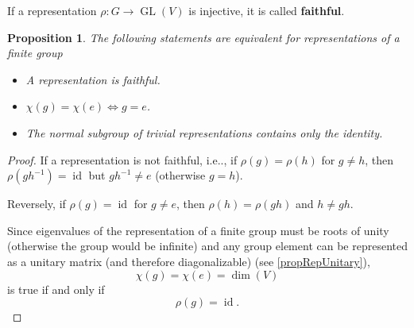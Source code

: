 \documentclass[12pt, letterpaper]{article}
\makeatletter
\newcommand{\GL}{\operatorname{GL}}
\newcommand{\idt}{\operatorname{id}}
\newcommand\ie{i.e\@ifnextchar.{}{.\@}}
\newtheorem{prop}{Proposition}[section]
\theoremstyle{definition}
\theoremstyle{remark}
\theoremstyle{definition}
\theoremstyle{plain}
\numberwithin{equation}{section}
\makeatother
\begin{document}
	\begin{def*}
		If a representation $\rho\colon G\to \GL(V)$ is injective, it is called \textbf{faithful}.
	\end{def*}
	\begin{prop}\label{propFaithful}
		The following statements are equivalent for representations of a finite group
		\begin{itemize}
			\item A representation is faithful.
			\item $\chi(g)=\chi(e)\iff g=e$.
			\item The normal subgroup of trivial representations contains only the identity.
		\end{itemize}
	\end{prop}
	\begin{proof}
		If a representation is not faithful, \ie, if $\rho(g)=\rho(h)$ for $g\ne h$,
		then $\rho(gh^{-1})=\idt$ but $gh^{-1}\ne e$ (otherwise $g=h$).
		
		Reversely, if $\rho(g)=\idt$ for $g\ne e$, then $\rho(h)=\rho(gh)$ and $h\ne gh$.
		
		Since eigenvalues of the representation of a finite group must be roots of unity (otherwise the group would be infinite)
		and any group element can be represented as a unitary matrix (and therefore diagonalizable) (see \ref{propRepUnitary}),
		\[\chi(g)=\chi(e)=\dim(V) \] is true if and only if \[\rho(g)=\idt.\]
	\end{proof}
\end{document}
